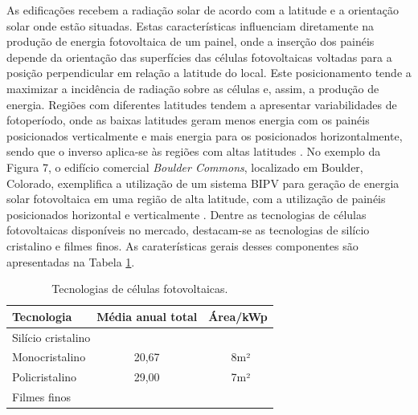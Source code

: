 \begin{onehalfspace}
\noindent As edificações recebem a radiação solar de acordo com a latitude e a orientação solar onde estão situadas. Estas características influenciam diretamente na produção de energia fotovoltaica de um painel, onde a inserção dos painéis depende da orientação das superfícies das células fotovoltaicas voltadas para a posição perpendicular em relação a latitude do local. Este posicionamento tende a maximizar a incidência de radiação sobre as células e, assim, a produção de energia. Regiões com diferentes latitudes tendem a apresentar variabilidades de fotoperíodo, onde as baixas latitudes geram menos energia com os painéis posicionados verticalmente e mais energia para os posicionados horizontalmente, sendo que o inverso aplica-se às regiões com altas latitudes \cite{Pereira2017}.\vspace{0.3cm} \newline
No exemplo da Figura 7, o edifício comercial \textit{Boulder Commons}, localizado em Boulder, Colorado, exemplifica a utilização de um sistema BIPV para geração de energia solar fotovoltaica em uma região de alta latitude, com a utilização de painéis posicionados horizontal e verticalmente \cite{AmericanSocietyofHeatingRefrigeratingandAir-ConditioningEngineers-ASHRAE2019,Pereira2017}. Dentre as tecnologias de células fotovoltaicas disponíveis no mercado, destacam-se as tecnologias de silício cristalino e filmes finos. As caraterísticas gerais desses componentes são apresentadas na Tabela \ref{tab:tabela1}.
        \begin{table}[ht]\centering
            \caption{\small Tecnologias de células fotovoltaicas.}
            \vspace*{0.2cm}
            \label{tab:tabela1}
            \begin{tabular}{lcc}
            \hline
            \textbf{Tecnologia}                     & \textbf{Média anual total}    & \textbf{Área/kWp} \\ \hline
            \multicolumn{3}{l}{Silício cristalino}                                                    \\ \hline
            Monocristalino                          & 20,67                         & ~8m²              \\ \hline
            Policristalino                          & 29,00                         & ~7m²              \\ \hline
            \multicolumn{3}{l}{Filmes finos}                                                          \\ \hline

\end{tabular}
\end{table}
\end{onehalfspace}
